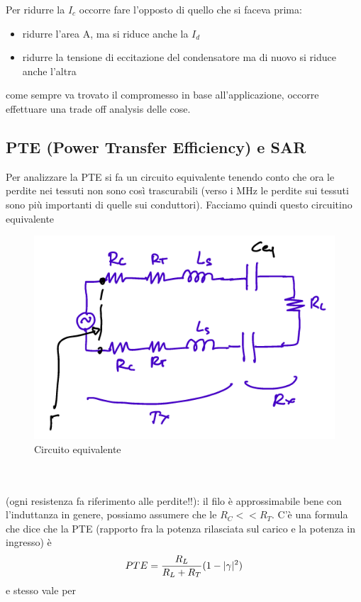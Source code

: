 \documentclass[oneside, 12pt]{extbook}
\DeclarePairedDelimiter{\abs}{\lvert}{\rvert}
\begin{document}
Per ridurre la $I_c$ occorre fare l'opposto di quello che si faceva prima:
\begin{itemize}
	\item ridurre l'area A, ma si riduce anche la $I_d$
	\item ridurre la tensione di eccitazione del condensatore ma di nuovo si riduce anche l'altra
\end{itemize}
come sempre va trovato il compromesso in base all'applicazione, occorre effettuare una trade off analysis delle cose.
\subsection{PTE (Power Transfer Efficiency) e SAR}
Per analizzare la PTE si fa un circuito equivalente tenendo conto che ora le perdite nei tessuti non sono così trascurabili (verso i MHz le perdite sui tessuti sono più importanti di quelle sui conduttori). Facciamo quindi questo circuitino equivalente\\
\begin{figure}[!h]
	\includegraphics[scale=0.5]{immagini/circ_equiv.png}
	\caption{Circuito equivalente}
\end{figure}\\\\
(ogni resistenza fa riferimento alle perdite!!): il filo è approssimabile bene con l'induttanza in genere, possiamo assumere che le $R_C <<R_T$. C'è una formula che dice che la PTE (rapporto fra la potenza rilasciata sul carico e la potenza in ingresso) è 
\begin{equation}
	PTE = \frac{R_L}{R_L + R_T} (1 - \abs{\gamma}^2)
\end{equation}
e stesso vale per 
\end{document}
